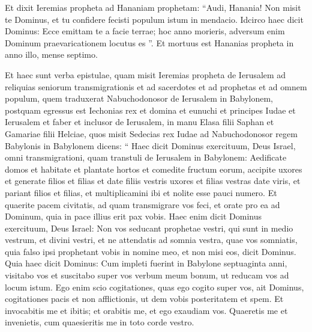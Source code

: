 \begin{biblechapter}
\begin{biblechapter}
\begin{biblechapter}
\begin{biblechapter}
\begin{biblechapter}
\begin{biblechapter}
\begin{biblechapter}
\begin{biblechapter}
\begin{biblechapter}
\begin{biblechapter}
\begin{biblechapter}
\begin{biblechapter}
\begin{biblechapter}
\begin{biblechapter}
\begin{biblechapter}
\begin{biblechapter}
\begin{biblechapter}
\begin{biblechapter}
\begin{biblechapter}
\begin{biblechapter}
\begin{biblechapter}
\begin{biblechapter}
\begin{biblechapter}
\begin{biblechapter}
\begin{biblechapter}
\begin{biblechapter}
\begin{biblechapter}
\begin{biblechapter}
 \verse Et dixit Ieremias propheta ad Hananiam prophetam: “Audi, Hanania! Non misit te Dominus, et tu confidere fecisti populum istum in mendacio. 
\verse Idcirco haec dicit Dominus: Ecce emittam te a facie terrae; hoc anno morieris, adversum enim Dominum praevaricationem locutus es ”. 
\verse Et mortuus est Hananias propheta in anno illo, mense septimo.
 
\begin{biblechapter}
\verse Et haec sunt verba epistulae, quam misit Ieremias propheta de Ierusalem ad reliquias seniorum transmigrationis et ad sacerdotes et ad prophetas et ad omnem populum, quem traduxerat Nabuchodonosor de Ierusalem in Babylonem, 
\verse postquam egressus est Iechonias rex et domina et eunuchi et principes Iudae et Ierusalem et faber et inclusor de Ierusalem, 
\verse in manu Elasa filii Saphan et Gamariae filii Helciae, quos misit Sedecias rex Iudae ad Nabuchodonosor regem Babylonis in Babylonem dicens:
 \verse “ Haec dicit Dominus exercituum, Deus Israel, omni transmigrationi, quam transtuli de Ierusalem in Babylonem: 
\verse Aedificate domos et habitate et plantate hortos et comedite fructum eorum, 
\verse accipite uxores et generate filios et filias et date filiis vestris uxores et filias vestras date viris, et pariant filios et filias, et multiplicamini ibi et nolite esse pauci numero. 
 \verse Et quaerite pacem civitatis, ad quam transmigrare vos feci, et orate pro ea ad Dominum, quia in pace illius erit pax vobis. 
\verse Haec enim dicit Dominus exercituum, Deus Israel: Non vos seducant prophetae vestri, qui sunt in medio vestrum, et divini vestri, et ne attendatis ad somnia vestra, quae vos somniatis, 
\verse quia falso ipsi prophetant vobis in nomine meo, et non misi eos, dicit Dominus. 
\verse Quia haec dicit Dominus: Cum impleti fuerint in Babylone septuaginta anni, visitabo vos et suscitabo super vos verbum meum bonum, ut reducam vos ad locum istum. 
\verse Ego enim scio cogitationes, quas ego cogito super vos, ait Dominus, cogitationes pacis et non afflictionis, ut dem vobis posteritatem et spem. 
\verse Et invocabitis me et ibitis; et orabitis me, et ego exaudiam vos. 
\verse Quaeretis me et invenietis, cum quaesieritis me in toto corde vestro. 

\end{biblechapter}
\end{biblechapter}
\end{biblechapter}
\end{biblechapter}
\end{biblechapter}
\end{biblechapter}
\end{biblechapter}
\end{biblechapter}
\end{biblechapter}
\end{biblechapter}
\end{biblechapter}
\end{biblechapter}
\end{biblechapter}
\end{biblechapter}
\end{biblechapter}
\end{biblechapter}
\end{biblechapter}
\end{biblechapter}
\end{biblechapter}
\end{biblechapter}
\end{biblechapter}
\end{biblechapter}
\end{biblechapter}
\end{biblechapter}
\end{biblechapter}
\end{biblechapter}
\end{biblechapter}
\end{biblechapter}
\end{biblechapter}
